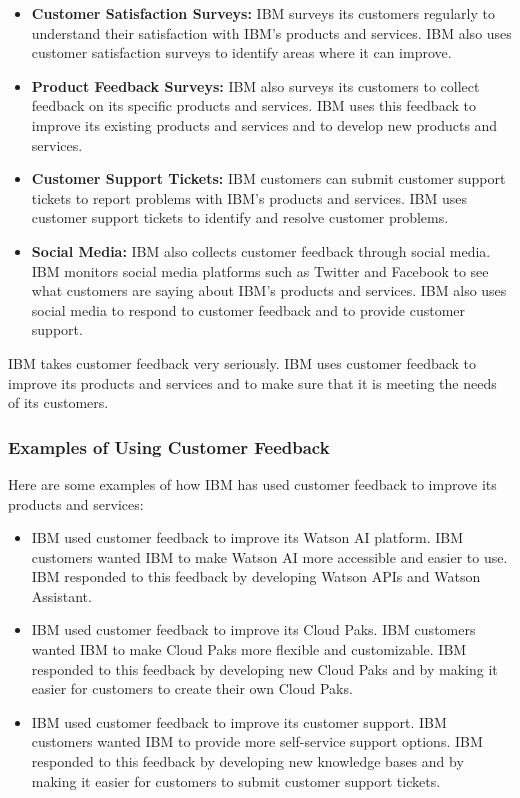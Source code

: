 \begin{itemize}
  \item \textbf{Customer Satisfaction Surveys:} IBM surveys its customers regularly to understand their satisfaction with IBM's products and services. IBM also uses customer satisfaction surveys to identify areas where it can improve.
  
  \item \textbf{Product Feedback Surveys:} IBM also surveys its customers to collect feedback on its specific products and services. IBM uses this feedback to improve its existing products and services and to develop new products and services.
  
  \item \textbf{Customer Support Tickets:} IBM customers can submit customer support tickets to report problems with IBM's products and services. IBM uses customer support tickets to identify and resolve customer problems.
  
  \item \textbf{Social Media:} IBM also collects customer feedback through social media. IBM monitors social media platforms such as Twitter and Facebook to see what customers are saying about IBM's products and services. IBM also uses social media to respond to customer feedback and to provide customer support.
\end{itemize}

IBM takes customer feedback very seriously. IBM uses customer feedback to improve its products and services and to make sure that it is meeting the needs of its customers.

\subsubsection{Examples of Using Customer Feedback}

Here are some examples of how IBM has used customer feedback to improve its products and services:

\begin{itemize}
  \item IBM used customer feedback to improve its Watson AI platform. IBM customers wanted IBM to make Watson AI more accessible and easier to use. IBM responded to this feedback by developing Watson APIs and Watson Assistant.
  
  \item IBM used customer feedback to improve its Cloud Paks. IBM customers wanted IBM to make Cloud Paks more flexible and customizable. IBM responded to this feedback by developing new Cloud Paks and by making it easier for customers to create their own Cloud Paks.
  
  \item IBM used customer feedback to improve its customer support. IBM customers wanted IBM to provide more self-service support options. IBM responded to this feedback by developing new knowledge bases and by making it easier for customers to submit customer support tickets.
\end{itemize}

